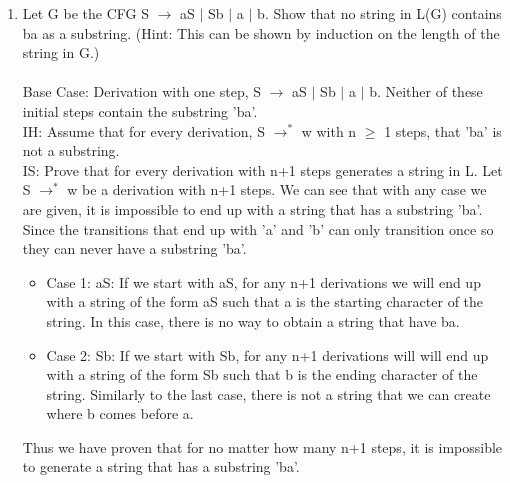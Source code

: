 \documentclass[12pt]{article}
\begin{document}
\begin{enumerate}
	\item Let G be the CFG S $\rightarrow$ aS $|$ Sb $|$ a $|$ b. Show that no string in L(G) contains ba as a substring. (Hint: This can be shown by induction on the length of the string in G.)\\\\
	Base Case: Derivation with one step, S $\rightarrow$ aS $|$ Sb $|$ a $|$ b. Neither of these initial steps contain the substring 'ba'.\\
	IH: Assume that for every derivation, S $\rightarrow^*$ w with n $\geq$ 1 steps, that 'ba' is not a substring.\\
	IS: Prove that for every derivation with n+1 steps generates a string in L. Let S $\rightarrow^*$ w be a derivation with n+1 steps. We can see that with any case we are given, it is impossible to end up with a string that has a substring 'ba'. Since the transitions that end up with 'a' and 'b' can only transition once so they can never have a substring 'ba'. 
	\begin{itemize}
		\item[] Case 1: aS:  If we start with aS, for any n+1 derivations we will end up with a string of the form aS such that a is the starting character of the string. In this case, there is no way to obtain a string that have ba.
		\item[] Case 2: Sb: If we start with Sb, for any n+1 derivations will will end up with a string of the form Sb such that b is the ending character of the string. Similarly to the last case, there is not a string that we can create where b comes before a.
	\end{itemize}
	Thus we have proven that for no matter how many n+1 steps, it is impossible to generate a string that has a substring 'ba'.
\end{enumerate}
\end{document}
